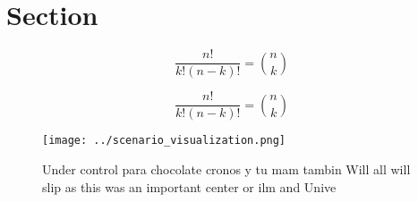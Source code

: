\documentclass[a4paper]{article}
\begin{document}
\section{Section}

\[ \frac{n!}{k!(n-k)!} = \binom{n}{k} \]

\[ \frac{n!}{k!(n-k)!} = \binom{n}{k} \]

\begin{figure}
\centering
\texttt{[image: ../scenario\_visualization.png]}
\caption{Under control para chocolate cronos y tu mam tambin Will all will slip as this was an important center or ilm and Unive
}
\end{figure}
 
\end{document}
